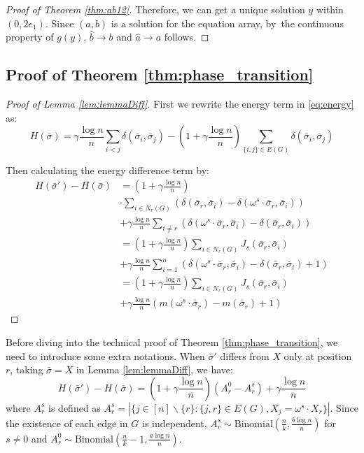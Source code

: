 \documentclass[entropy,article,accept,moreauthors,pdftex]{Definitions/mdpi}
\newcommand{\A}{\frac{a \log n}{n}}
\newcommand{\B}{\frac{b \log n}{n}}
\newcommand{\1}{\mathbbm{1}}
\begin{document}
\begin{paracol}{2}
\begin{proof}[Proof of Theorem \ref{thm:ab12}]
Therefore, we can get a unique solution $y$ within $(0, 2e_1)$. Since $(a,b)$ is a solution for the equation array, by~the continuous property of $g(y)$, $\hat{b} \to b$ and $\hat{a} \to a$ follows.
\end{proof}
\subsection{Proof of Theorem \ref{thm:phase_transition}}\label{subsec:pt}
\begin{proof}[Proof of Lemma \ref{lem:lemmaDiff}]
	First we rewrite the energy term in \eqref{eq:energy} as:
	\begin{equation*}
	H(\bar{\sigma}) = \gamma \frac{\log n}{n} \sum_{i < j} \delta(\bar{\sigma}_i, \bar{\sigma}_j)
	- (1 + \gamma\frac{\log n}{n}) \sum_{ \{i, j\} \in E(G)} \delta(\bar{\sigma}_i, \bar{\sigma}_j)
	\end{equation*}
	
	Then calculating the energy difference term by:
	\begin{align*}
	H(\bar{\sigma}') - H(\bar{\sigma}) &= (1 + \gamma\frac{\log n}{n}) \\
	&\cdot \sum_{i \in N_r(G)} (\delta(\bar{\sigma}_r, \bar{\sigma}_i) -
	\delta(\omega^s \cdot \bar{\sigma}_r, \bar{\sigma}_i)) \\
	&+ \gamma \frac{\log n}{n}\sum_{i\neq r}
	( \delta(\omega^s \cdot \bar{\sigma}_r, \bar{\sigma}_i) -
	\delta( \bar{\sigma}_r, \bar{\sigma}_i) ) \\
	& = (1 + \gamma\frac{\log n}{n})\sum_{i \in N_r(G)} J_s(\bar{\sigma}_r, \bar{\sigma}_i) \\
	&+ \gamma \frac{\log n}{n}\sum_{i=1}^n
	( \delta(\omega^s \cdot \bar{\sigma}_r, \bar{\sigma}_i) -
	\delta( \bar{\sigma}_r, \bar{\sigma}_i) +1) \\
	&= (1+\gamma \frac{\log n}{n})\sum_{i \in N_r(G)} J_s(\bar{\sigma}_r, \bar{\sigma}_i)\\
	&+ \gamma \frac{\log n}{n} (m(\omega^s \cdot \bar{\sigma}_r)-m(\bar{\sigma}_r)+1)
	\end{align*}
\end{proof}
Before diving into the technical proof of Theorem \ref{thm:phase_transition}, we need to introduce some extra
notations. When $\bar{\sigma}'$ differs from $X$ only at position $r$, taking $\bar{\sigma}=X$ in Lemma \ref{lem:lemmaDiff}, we have:
\begin{equation}\label{eq:energy_diff}
H(\bar{\sigma}') - H(\bar{\sigma}) = (1+\gamma \frac{\log n}{n})(A^0_r - A^s_r) + \gamma\frac{\log n}{n}
\end{equation}
where $A^s_r$ is defined as $A^s_r = |\{j \in [n]\backslash \{r\}: \{j, r\} \in E(G), X_j = \omega^s \cdot X_r \}|$.
Since the existence of each edge in $G$ is independent, $A^s_r \sim \textrm{Binomial}(\frac{n}{k}, \B ) $ for $s\neq 0$
and $A^0_r \sim \textrm{Binomial}(\frac{n}{k}-1, \A )$.


\end{paracol}
\end{document}
